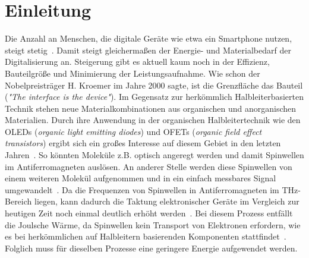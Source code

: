\chapter{Einleitung}
    Die Anzahl an Menschen, die digitale Geräte wie etwa ein Smartphone nutzen, steigt stetig~\cite{Statista}.
    Damit steigt gleichermaßen der Energie- und Materialbedarf der Digitalisierung an.
    Steigerung gibt es aktuell kaum noch in der Effizienz, Bauteilgröße und Minimierung der Leistungsaufnahme.
    Wie schon der Nobelpreisträger H. Kroemer im Jahre 2000 sagte, ist die Grenzfläche das Bauteil (\textit{"The interface is the device"}).
    Im Gegensatz zur herkömmlich Halbleiterbasierten Technik stehen neue Materialkombinationen aus organischen und anorganischen Materialien.
    Durch ihre Anwendung in der organischen Halbleitertechnik wie den OLEDs (\textit{organic light emitting diodes}) und OFETs (\textit{organic field effect transistors}) ergibt sich ein großes Interesse auf diesem Gebiet in den letzten Jahren~\cite{Uni-Tübingen}.
    So könnten Moleküle z.B. optisch angeregt werden und damit Spinwellen im Antiferromagneten auslösen. 
    An anderer Stelle werden diese Spinwellen von einem weiteren Molekül aufgenommen und in ein einfach messbares Signal umgewandelt~\cite{SINFONIA}.
    Da die Frequenzen von Spinwellen in Antiferromagneten im \si{\tera\hertz}-Bereich liegen, kann dadurch die Taktung elektronischer Geräte im Vergleich zur heutigen Zeit noch einmal deutlich erhöht werden~\cite{AFM_5}.
    Bei diesem Prozess entfällt die Joulsche Wärme, da Spinwellen kein Transport von Elektronen erfordern, wie es bei herkömmlichen auf Halbleitern basierenden Komponenten stattfindet~\cite{AFM_3}.
    Folglich muss für dieselben Prozesse eine geringere Energie aufgewendet werden.
   
